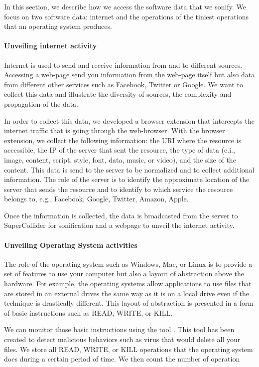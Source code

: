 In this section, we describe how we access the software data that we sonify. 
We focus on two software data: internet and the operations of the tiniest operations that an operating system produces.

\paragraph{Unveiling internet activity}
Internet is used to send and receive information from and to different sources. 
Accessing a web-page send you information from the web-page itself but also data from different other services such as Facebook, Twitter or Google.
We want to collect this data and illustrate the diversity of sources, the complexity and propagation of the data.

In order to collect this data, we developed a browser extension that intercepts the internet traffic that is going through the web-browser. 
With the browser extension, we collect the following information: the URI where the resource is accessible, the IP of the server that sent the resource, the type of data (e.i., image, content, script, style, font, data, music, or video), and the size of the content. 
This data is send to the server to be normalized and to collect additional information.
The role of the server is to identify the approximate location of the server that sends the resource and to identify to which service the resource belongs to, e.g., Facebook, Google, Twitter, Amazon, Apple.

Once the information is collected, the data is broadcasted from the server to SuperCollider for sonification and a webpage to unveil the internet activity.

\paragraph{Unveiling Operating System activities}
The role of the operating system such as Windows, Mac, or Linux is to provide a set of features to use your computer but also a layout of abstraction above the hardware. For example, the operating systems allow applications to use files that are stored in an external drives the same way as it is on a local drive even if the technique is drastically different.
This layout of abstraction is presented in a form of basic instructions such as READ, WRITE, or KILL. 

We can monitor those basic instructions using the tool . This tool has been created to detect malicious behaviors such as virus that would delete all your files. 
We store all READ, WRITE, or KILL operations that the operating system does during a certain period of time.
We then count the number of operation 